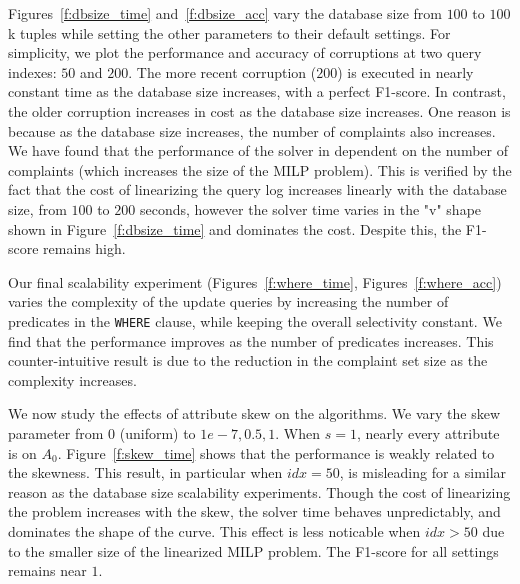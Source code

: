 Figures~\ref{f:dbsize_time} and~\ref{f:dbsize_acc} vary the database size from $100$ to $100$k tuples while setting the other parameters to their default settings.
For simplicity, we plot the performance and accuracy of corruptions at two query indexes: $50$ and $200$.
The more recent corruption ($200$) is executed in nearly constant time as the database size increases, with a perfect F1-score.
In contrast, the older corruption increases in cost as the database size increases.  One reason is because as the database size increases, the
number of complaints also increases.  We have found that the performance of the solver in dependent on the number of complaints (which
increases the size of the MILP problem).  This is verified by the fact that the cost of linearizing the query log increases linearly with the 
database size, from $100$ to $200$ seconds, however the solver time varies in the "v" shape shown in Figure~\ref{f:dbsize_time}
and dominates the cost.   Despite this, the F1-score remains high.




Our final scalability experiment (Figures~\ref{f:where_time}, Figures~\ref{f:where_acc})
varies the complexity of the update queries by increasing the number of predicates in the \texttt{WHERE} clause, 
while keeping the overall selectivity constant.   We find that the performance improves as the number of predicates increases.
This counter-intuitive result is due to the reduction in the complaint set size as the complexity increases.




 We now study the effects of attribute skew on the algorithms.
We vary the skew parameter from $0$ (uniform) to $1e-7, 0.5, 1$. When $s=1$, nearly every attribute is on $A_0$.
Figure~\ref{f:skew_time} shows that the performance is weakly related to the skewness.  
This result, in particular when $idx=50$, is misleading for a similar reason as the database size scalability experiments.
Though the cost of linearizing the problem increases with the skew, the solver time behaves 
unpredictably, and dominates the shape of the curve.  This effect is less noticable when $idx > 50$
due to the smaller size of the linearized MILP problem.
The F1-score for all settings remains near $1$.


